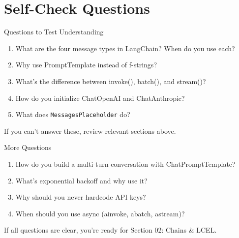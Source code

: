 \documentclass[aspectratio=169,11pt]{beamer}
\begin{document}
\section{Self-Check Questions}

\begin{frame}{Questions to Test Understanding}
  \begin{enumerate}
    \setlength{\itemsep}{1pt}
    \item What are the four message types in LangChain? When do you use each?
    \item Why use PromptTemplate instead of f-strings?
    \item What's the difference between invoke(), batch(), and stream()?
    \item How do you initialize ChatOpenAI and ChatAnthropic?
    \item What does \texttt{MessagesPlaceholder} do?
  \end{enumerate}

  \vspace{0.08cm}
  \begin{tipbox}
    If you can't answer these, review relevant sections above.
  \end{tipbox}
\end{frame}

\begin{frame}{More Questions}
  \begin{enumerate}
    \setlength{\itemsep}{1pt}
    \setcounter{enumi}{5}
    \item How do you build a multi-turn conversation with ChatPromptTemplate?
    \item What's exponential backoff and why use it?
    \item Why should you never hardcode API keys?
    \item When should you use async (ainvoke, abatch, astream)?
  \end{enumerate}

  \vspace{0.4cm}
  \begin{conceptbox}[Ready?]
    If all questions are clear, you're ready for Section 02: Chains \& LCEL.
  \end{conceptbox}
\end{frame}
\end{document}
